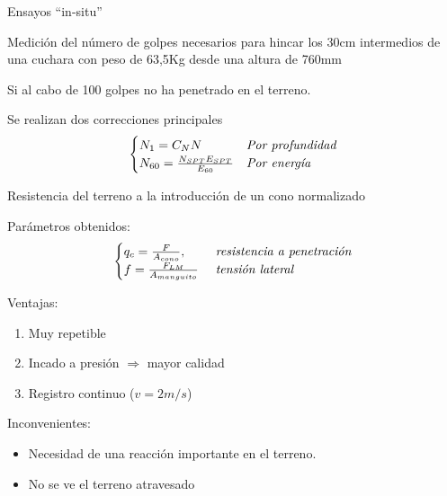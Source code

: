 
\begin{mybox}{Ensayos ``in-situ''}
	\begin{ldef}[SPT]
		Medición del número de golpes necesarios para hincar los 30cm intermedios de una cuchara con peso de 63,5Kg desde una altura de 760mm
	\end{ldef}
	\begin{ldef}[Rechazo]
		Si al cabo de 100 golpes no ha penetrado en el terreno.
	\end{ldef}
	\begin{myrem}[Correcciones]
		Se realizan dos correcciones principales
		\begin{equation}
			\begin{cases}
				N_1 = C_N N & \emph{Por profundidad}\\
				N_{60} = \frac{N_{SPT}E_{SPT}}{E_{60}} & \emph{Por energía}
			\end{cases}
		\end{equation}
	\end{myrem}

	\begin{ldef}[CPT]
		Resistencia del terreno a la introducción de un cono normalizado
	\end{ldef}
	Parámetros obtenidos:
	\begin{equation}
		\begin{cases}
			q_c = \frac{F}{A_{cono}}, & \emph{ resistencia a penetración}\\
			f = \frac{F_{LM}}{A_{manguito}} & \emph{ tensión lateral}
		\end{cases}
	\end{equation}
	\begin{minipage}[t]{0.5\textwidth}
	Ventajas:
	\begin{enumerate}
		\item Muy repetible
		\item Incado a presión $\Rightarrow$ mayor calidad
		\item Registro continuo ($v= 2 m/s$)
	\end{enumerate}
	\end{minipage}%
	\begin{minipage}[t]{0.5\textwidth}
	Inconvenientes:
		\begin{itemize}
			\item Necesidad de una reacción importante en el terreno.
			\item No se ve el terreno atravesado
		\end{itemize}
	\end{minipage}


\end{mybox}
